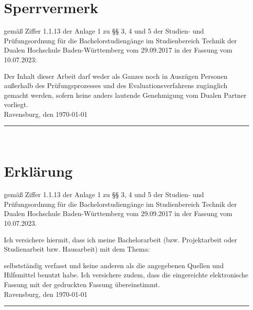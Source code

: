 
\chapter*{Sperrvermerk} 
gemäß Ziffer 1.1.13 der Anlage 1 zu §§ 3, 4 und 5  der Studien- und Prüfungsordnung für die Bachelorstudiengänge im Studienbereich Technik der Dualen 
Hochschule Baden-Württemberg vom 29.09.2017 in der Fassung vom 10.07.2023:

Der Inhalt dieser Arbeit darf weder als Ganzes noch in Auszügen Personen außerhalb des Prüfungsprozesses und des Evaluationsverfahrens zugänglich gemacht 
werden, sofern keine anders lautende Genehmigung vom Dualen Partner vorliegt.\\[6ex]

Ravensburg, den \today \\[4ex]

\rule[-0.2cm]{5cm}{0.5pt}

\autor \\[10ex]

\chapter*{Erklärung} %

gemäß Ziffer 1.1.13 der Anlage 1 zu §§ 3, 4 und 5  der Studien- und Prüfungsordnung für die Bachelorstudiengänge im Studienbereich Technik der Dualen 
Hochschule Baden-Württemberg vom 29.09.2017 in der Fassung vom 10.07.2023.

Ich versichere hiermit, dass ich meine Bachelorarbeit (bzw. Projektarbeit oder Studienarbeit bzw. Hausarbeit) mit dem Thema:

\begin{quote}
	\textit{\titel} %
\end{quote}

selbstständig verfasst und keine anderen als die angegebenen Quellen und Hilfsmittel benutzt habe. Ich versichere zudem, dass die eingereichte elektronische 
Fassung mit der gedruckten Fassung übereinstimmt.\\[6ex]

Ravensburg, den \today \\[1ex]

\rule[-0.2cm]{5cm}{0.5pt}

\autor \\[10ex]

\rmfamily


